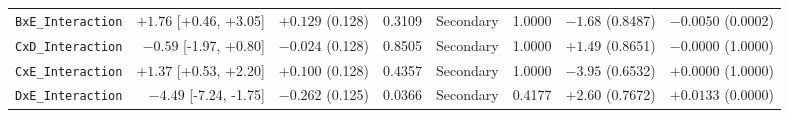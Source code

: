 \begin{table}[t]
{\begin{tabular}{@{}lrrrrrrr@{}}
\texttt{BxE\_Interaction} & $+1.76$ [+0.46, +3.05] & $+0.129$ (0.128) & 0.3109 & Secondary & 1.0000 & $-1.68$ (0.8487) & $-0.0050$ (0.0002) \\
\texttt{CxD\_Interaction} & $-0.59$ [-1.97, +0.80] & $-0.024$ (0.128) & 0.8505 & Secondary & 1.0000 & $+1.49$ (0.8651) & $-0.0000$ (1.0000) \\
\texttt{CxE\_Interaction} & $+1.37$ [+0.53, +2.20] & $+0.100$ (0.128) & 0.4357 & Secondary & 1.0000 & $-3.95$ (0.6532) & $+0.0000$ (1.0000) \\
\texttt{DxE\_Interaction} & $-4.49$ [-7.24, -1.75] & $-0.262$ (0.125) & 0.0366 & Secondary & 0.4177 & $+2.60$ (0.7672) & $+0.0133$ (0.0000) \\
\bottomrule
\end{tabular}%
}
\end{table}
